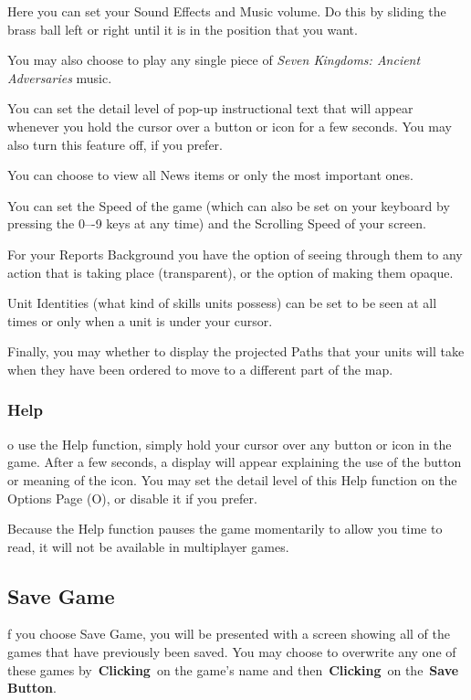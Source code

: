 Here you can set your Sound Effects and Music volume. Do this by sliding the brass ball left or right until it is in the position that you want.

You may also choose to play any single piece of \textit{Seven Kingdoms: Ancient Adversaries} music.

You can set the detail level of pop-up instructional text that will appear whenever you hold the cursor over a button or icon for a few seconds. You may also turn this feature off, if you prefer.

You can choose to view all News items or only the most important ones.

You can set the Speed of the game (which can also be set on your keyboard by pressing the 0–-9 keys at any time) and the Scrolling Speed of your screen.

For your Reports Background you have the option of seeing through them to any action that is taking place (transparent), or the option of making them opaque.

Unit Identities (what kind of skills units possess) can be set to be seen at all times or only when a unit is under your cursor.

Finally, you may whether to display the projected Paths that your units will take when they have been ordered to move to a different part of the map.

\subsubsection{Help}


o use the Help function, simply hold your cursor over any button or icon in the game. After a few seconds, a display will appear explaining the use of the button or meaning of the icon. You may set the detail level of this Help function on the Options Page (O), or disable it if you prefer.

Because the Help function pauses the game momentarily to allow you time to read, it will not be available in multiplayer games.

\subsection{Save Game}


f you choose Save Game, you will be presented with a screen showing all of the games that have previously been saved. You may choose to overwrite any one of these games by \textbf{Clicking} on the game’s name and then \textbf{Clicking} on the \textbf{Save Button}.

